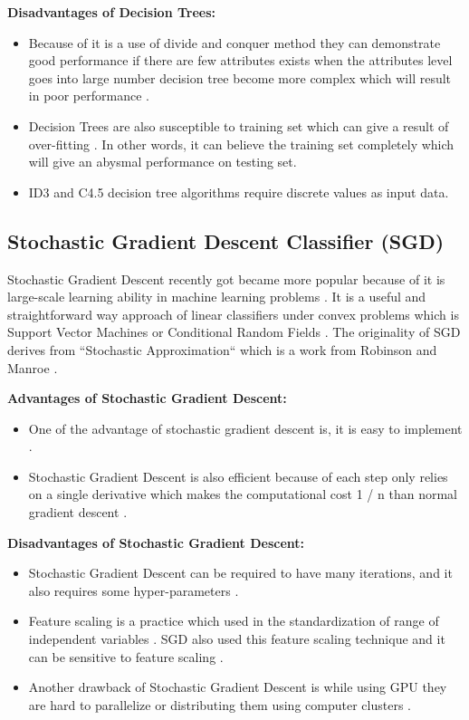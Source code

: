 \documentclass[sigconf]{acmart}
\begin{document}
\textbf{Disadvantages of Decision Trees:}

\begin{itemize}
\item Because of it is a use of divide and conquer method they can demonstrate good performance if there are few attributes exists when the attributes level goes into large number decision tree become more complex which will result in poor performance \cite{www-cs.ubb}.
\item Decision Trees are also susceptible to training set which can give a result of over-fitting \cite{www-cs.ubb}. In other words, it can believe the training set completely which will give an abysmal performance on testing set.
\item ID3 and C4.5 decision tree algorithms require discrete values as input data. 
\end{itemize}

\subsection{Stochastic Gradient Descent Classifier (SGD)}

Stochastic Gradient Descent recently got became more popular because of it is large-scale learning ability in machine learning problems \cite{fan-stochastic}. It is a useful and straightforward way approach of linear classifiers under convex problems which is Support Vector Machines or Conditional Random Fields \cite{www-bottou}. The originality of SGD derives from ``Stochastic Approximation`` which is a work from Robinson and Manroe \cite{Needell2016}. 

\textbf{Advantages of Stochastic Gradient Descent:}

\begin{itemize}
\item One of the advantage of stochastic gradient descent is, it is easy to implement \cite{www-scikit-stochastic-gradient}.
\item Stochastic Gradient Descent is also efficient because of each step only relies on a single derivative which makes the computational cost  {1} / {n} than normal gradient descent \cite{NIPS2013_4937}.
\end{itemize}

\textbf{Disadvantages of Stochastic Gradient Descent:}

\begin{itemize}
\item Stochastic Gradient Descent can be required to have many iterations, and it also requires some hyper-parameters \cite{www-scikit-stochastic-gradient}. 
\item Feature scaling is a practice which used in the standardization of range of independent variables \cite{www-wikipedia-futurescaling}. SGD also used this feature scaling technique and it can be sensitive to feature scaling \cite{www-scikit-stochastic-gradient}. 
\item Another drawback of Stochastic Gradient Descent is while using GPU they are hard to parallelize or distributing them using computer clusters \cite{andrewng-deeplearning}. 
\end{itemize}
\end{document}
